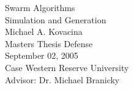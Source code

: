 \begin{slide}{}
  \centering
   Swarm Algorithms\\
   Simulation and Generation\\
  \vspace{5ex}
   Michael A. Kovacina\\
  \vspace{5ex}
  Masters Thesis Defense\\
  September 02, 2005\\
  \vspace{2ex}
  Case Western Reserve University\\
  Advisor: Dr. Michael Branicky\\
\end{slide}
